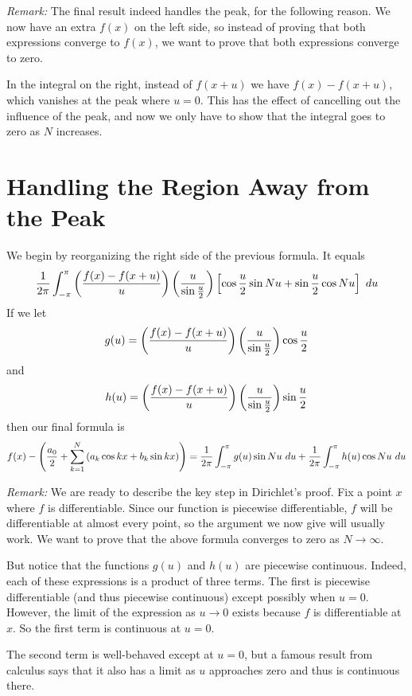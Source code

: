 \documentclass[11pt, oneside]{article}   	%
\begin{document}
{\em Remark:} The final result indeed handles the peak, for the following reason. We now have an extra $f(x)$ on the left side, so instead of proving that both expressions converge to $f(x)$, we want to prove that both expressions converge to zero. 

In the integral on the right, instead of $f(x + u)$ we have $f(x) - f(x + u)$,
which vanishes at the peak where $u = 0$. This has the effect of cancelling out the influence of the peak,
and now we only have to show that the integral goes to zero as $N$ increases.


\section{Handling the Region Away from the Peak}
 
We begin by reorganizing the right side of the previous formula. It equals
\[ {1 \over {2 \pi}} \int_{- \pi}^\pi \left( {{f(x) - f(x + u)} \over {u}}\right)  \left( {{u} \over {\sin {{u} \over 2}}} \right)
\left[\cos {u \over 2} \sin Nu + \sin {u \over 2} \cos Nu \right] \ du\]
If we let
\[g(u) = \left( {{f(x) - f(x + u)} \over {u}}\right)  \left( {{u} \over {\sin {{u} \over 2}}} \right) \cos {u \over 2}\]
and
\[h(u) = \left( {{f(x) - f(x + u)} \over {u}}\right)  \left( {{u} \over {\sin {{u} \over 2}}} \right) \sin {u \over 2}\]
then our final formula is
\[f(x) - \left({{a_0} \over 2} + \sum_{k = 1}^N \left( a_k \cos kx + b_k \sin kx \right)\right) = {1 \over {2 \pi}} \int_{- \pi}^\pi g(u) \sin Nu \ du +  {1 \over {2 \pi}} \int_{- \pi}^\pi h(u) \cos Nu \ du\]

{\em Remark:} We are ready to describe the key step in Dirichlet's proof. Fix a point $x$ where $f$ is differentiable. Since our function is piecewise differentiable, $f$ will be differentiable at almost every point, so the argument we now give will usually work. We want to prove that the above formula converges to zero as $N \rightarrow \infty$. 

But notice that the functions $g(u)$ and $h(u)$ are piecewise continuous. Indeed, each of these expressions is a product of three terms. The first is piecewise differentiable (and thus piecewise continuous) except possibly when $u = 0$. However, the limit of the expression as $u \rightarrow 0$ exists because $f$ is differentiable at $x$. So the first term is continuous at $u = 0$.

The second term is well-behaved except at $u = 0$, but a famous result from calculus says that it also has a limit as $u$ approaches zero and thus is continuous there. 
\end{document}
